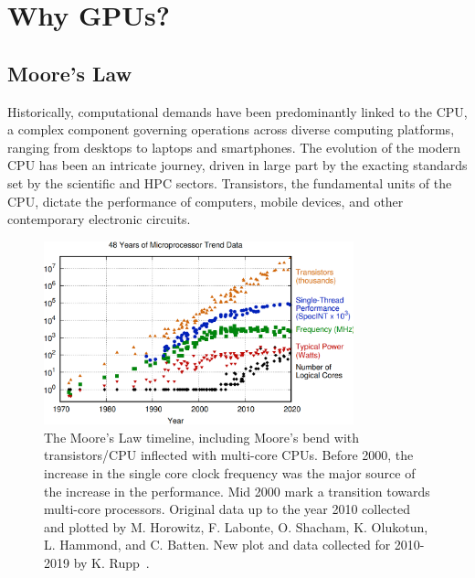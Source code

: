 \section{Why GPUs?}


\subsection{Moore’s Law}


\par
Historically, computational demands have been predominantly linked to the CPU, a complex component governing operations across diverse computing platforms, ranging from desktops to laptops and smartphones. The evolution of the modern CPU has been an intricate journey, driven in large part by the exacting standards set by the scientific and HPC sectors. Transistors, the fundamental units of the CPU, dictate the performance of computers, mobile devices, and other contemporary electronic circuits.

\begin{figure}[!h]
\centering\includegraphics[width=0.8\textwidth]{fig_logo_history/microprocessor_trend.png}
\caption{The Moore’s Law timeline, including Moore's bend with transistors/CPU inflected with multi-core CPUs. Before 2000, the increase in the single core clock frequency was the major source of the increase in the performance. Mid 2000 mark a transition towards multi-core processors. Original data up to the year 2010 collected and plotted by M. Horowitz, F. Labonte, O. Shacham, K. Olukotun, L. Hammond, and C. Batten. New plot and data collected for 2010-2019 by K. Rupp~\cite{microprocessor-trend-data}.}\label{fig:microprocessor_trend}
\end{figure}


